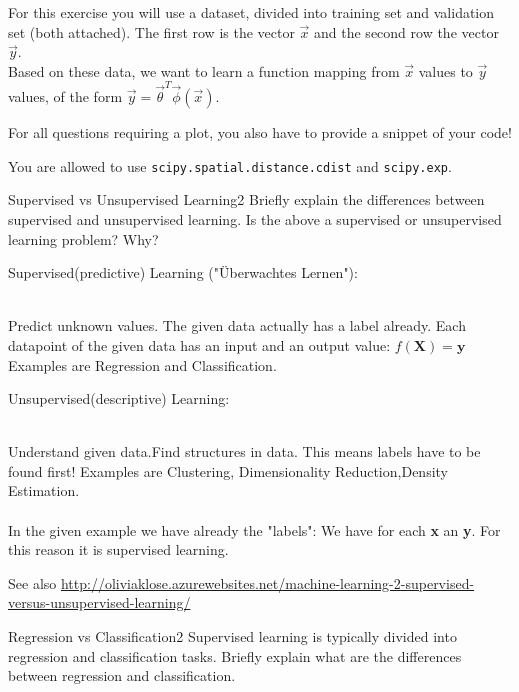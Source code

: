 


For this exercise you will use a dataset, divided into training set and validation set (both attached). The first row is the vector $\vec x$ and the second row the vector $\vec y.$
\\
Based on these data, we want to learn a function mapping from $\vec x$ values to $\vec y$ values, of the form $\vec y=\vec{\theta}^{T}\vec{\phi}(\vec x)$.

For all questions requiring a plot, you also have to provide a snippet of your code!

You are allowed to use \texttt{scipy.spatial.distance.cdist} and \texttt{scipy.exp}.

\begin{questions}
	
	
	\begin{question}{Supervised vs Unsupervised Learning}{2}
		Briefly explain the differences between supervised and unsupervised learning. 
		Is the above a supervised or unsupervised learning problem? Why?

\begin{answer}
		\begin{large}
			Supervised(predictive) Learning ("\"Uberwachtes Lernen"):
		\end{large}
	\\Predict unknown values. The given data actually has a label already. Each datapoint of the given data has an input and an output value:
	$f(\mathbf{X})=\mathbf{y}$ \\
	 Examples are Regression and Classification.
	\newline
	\newline
	\begin{large}
		Unsupervised(descriptive) Learning:
	\end{large}
	\\Understand given data.Find structures in data. This means labels have to be found first!
	Examples are Clustering, Dimensionality Reduction,Density Estimation.
	\\ 
	\\
	In the given example we have already the "labels": We have for each \textbf{x} an \textbf{y}. For this reason it is supervised learning.
	
	See also \hyperlink{http://oliviaklose.azurewebsites.net/machine-learning-2-supervised-versus-unsupervised-learning/}{http://oliviaklose.azurewebsites.net/machine-learning-2-supervised-versus-unsupervised-learning/}
	\end{answer}
	\end{question}
	\begin{question}{Regression vs Classification}{2}
		Supervised learning is typically divided into regression and classification tasks. 
		Briefly explain what are the differences between regression and classification.


\end{question}
\end{questions}
